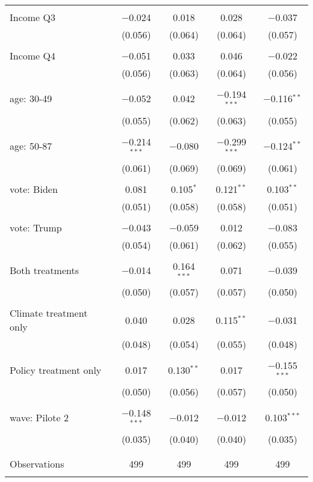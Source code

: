 \begin{tabular}{@{\extracolsep{5pt}}lcccc}
  & & & & \\ 
 Income Q3 & $-$0.024 & 0.018 & 0.028 & $-$0.037 \\ 
  & (0.056) & (0.064) & (0.064) & (0.057) \\ 
  & & & & \\ 
 Income Q4 & $-$0.051 & 0.033 & 0.046 & $-$0.022 \\ 
  & (0.056) & (0.063) & (0.064) & (0.056) \\ 
  & & & & \\ 
 age: 30-49 & $-$0.052 & 0.042 & $-$0.194$^{***}$ & $-$0.116$^{**}$ \\ 
  & (0.055) & (0.062) & (0.063) & (0.055) \\ 
  & & & & \\ 
 age: 50-87 & $-$0.214$^{***}$ & $-$0.080 & $-$0.299$^{***}$ & $-$0.124$^{**}$ \\ 
  & (0.061) & (0.069) & (0.069) & (0.061) \\ 
  & & & & \\ 
 vote: Biden & 0.081 & 0.105$^{*}$ & 0.121$^{**}$ & 0.103$^{**}$ \\ 
  & (0.051) & (0.058) & (0.058) & (0.051) \\ 
  & & & & \\ 
 vote: Trump & $-$0.043 & $-$0.059 & 0.012 & $-$0.083 \\ 
  & (0.054) & (0.061) & (0.062) & (0.055) \\ 
  & & & & \\ 
 Both treatments & $-$0.014 & 0.164$^{***}$ & 0.071 & $-$0.039 \\ 
  & (0.050) & (0.057) & (0.057) & (0.050) \\ 
  & & & & \\ 
 Climate treatment only & 0.040 & 0.028 & 0.115$^{**}$ & $-$0.031 \\ 
  & (0.048) & (0.054) & (0.055) & (0.048) \\ 
  & & & & \\ 
 Policy treatment only & 0.017 & 0.130$^{**}$ & 0.017 & $-$0.155$^{***}$ \\ 
  & (0.050) & (0.056) & (0.057) & (0.050) \\ 
  & & & & \\ 
 wave: Pilote 2 & $-$0.148$^{***}$ & $-$0.012 & $-$0.012 & 0.103$^{***}$ \\ 
  & (0.035) & (0.040) & (0.040) & (0.035) \\ 
  & & & & \\ 
\hline \\[-1.8ex] 

Observations & 499 & 499 & 499 & 499 \\ 
\hline 
\hline \\[-1.8ex] 
\end{tabular} 